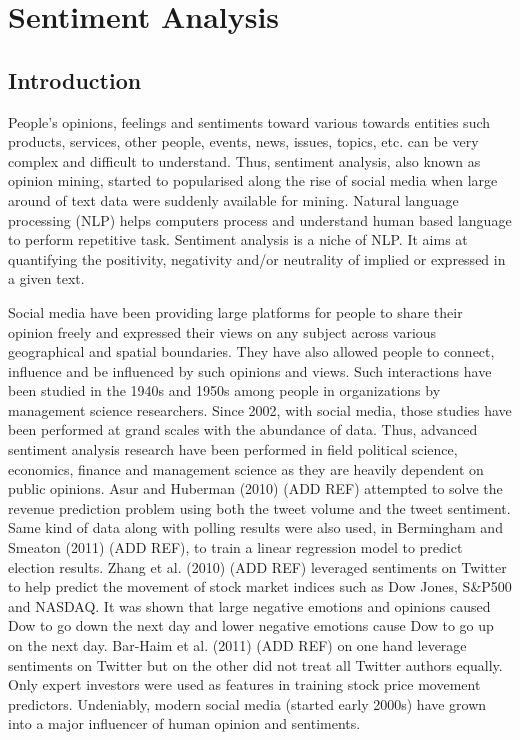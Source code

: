 \chapter{Sentiment Analysis}
\section{Introduction}
People's opinions, feelings and sentiments toward various towards entities such products, services, other people, events, news, issues, topics, etc. can be very complex and difficult to understand. Thus, sentiment analysis, also known as opinion mining, started to popularised along the rise of social media when large around of text data were suddenly available for mining. Natural language processing (NLP) helps computers process and understand human based language to perform repetitive task. Sentiment analysis is a niche of NLP. It aims at quantifying the positivity, negativity and/or neutrality of implied or expressed in a given text.

Social media have been providing large platforms for people to share their opinion freely and expressed their views on any subject across various geographical and spatial  boundaries. They have also allowed people to connect, influence and be influenced by such opinions and views. Such interactions have been studied in the 1940s and 1950s among people in organizations by management science researchers. Since 2002, with social media, those studies have been performed at grand scales with the abundance of data. Thus, advanced sentiment analysis research have been performed in field political science, economics, finance and management science as they are heavily dependent on public opinions. Asur and Huberman (2010) (ADD REF) attempted to solve the revenue prediction problem using both the tweet volume and the tweet sentiment. Same kind of data along with polling results were also used, in Bermingham and Smeaton (2011) (ADD REF), to train a linear regression model to predict election results. Zhang et al. (2010) (ADD REF) leveraged sentiments on Twitter to help predict the movement of stock market indices such as Dow Jones, S\&P500 and NASDAQ. It was shown that large negative emotions and opinions caused Dow to go down the next day and lower negative emotions cause Dow to go up on the next day. Bar-Haim et al. (2011) (ADD REF) on one hand leverage sentiments on Twitter but on the other did not treat all Twitter authors equally. Only expert investors were used as features in training stock price movement predictors. Undeniably, modern social media (started early 2000s) have grown into a major influencer of human opinion and sentiments.

